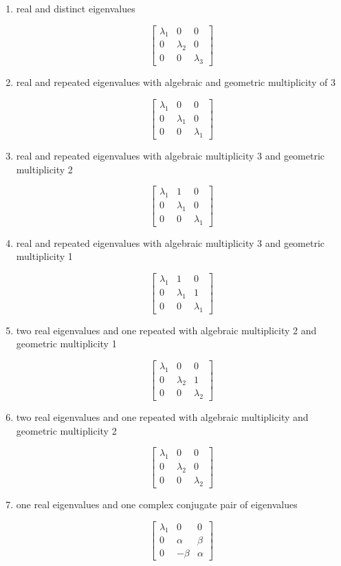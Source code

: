 \documentclass[12pt]{article}
\theoremstyle{definition}
\begin{document}
\begin{enumerate}
\item real and distinct eigenvalues

\[
\begin{bmatrix}
\lambda_1 & 0 & 0 \\
0 & \lambda_2 & 0 \\
0 & 0 & \lambda_3
\end{bmatrix}
\]

\item real and repeated eigenvalues with algebraic and geometric multiplicity of 3

\[
\begin{bmatrix}
\lambda_1 & 0 & 0 \\
0 & \lambda_1 & 0 \\
0 & 0 & \lambda_1
\end{bmatrix}
\]

\item real and repeated eigenvalues with algebraic multiplicity 3 and geometric multiplicity 2 

\[
\begin{bmatrix}
\lambda_1 & 1 & 0 \\
0 & \lambda_1 & 0 \\
0 & 0 & \lambda_1
\end{bmatrix}
\]

\item real and repeated eigenvalues with algebraic multiplicity 3 and geometric multiplicity 1

\[
\begin{bmatrix}
\lambda_1 & 1 & 0 \\
0 & \lambda_1 & 1 \\
0 & 0 & \lambda_1
\end{bmatrix}
\]

\item two real eigenvalues and one repeated with algebraic multiplicity 2 and geometric multiplicity 1

 
\[
\begin{bmatrix}
\lambda_1 & 0 & 0 \\
0 & \lambda_2 & 1 \\
0 & 0 & \lambda_2
\end{bmatrix}
\]

\item two real eigenvalues and one repeated with algebraic multiplicity and geometric multiplicity 2

\[
\begin{bmatrix}
\lambda_1 & 0 & 0 \\
0 & \lambda_2 & 0 \\
0 & 0 & \lambda_2
\end{bmatrix}
\]

\item one real eigenvalues and one complex conjugate pair of eigenvalues

\[
\begin{bmatrix}
\lambda_1 & 0 & 0 \\
0 & \alpha & \beta \\
0 & -\beta & \alpha
\end{bmatrix}
\]
\end{enumerate}
\end{document}
